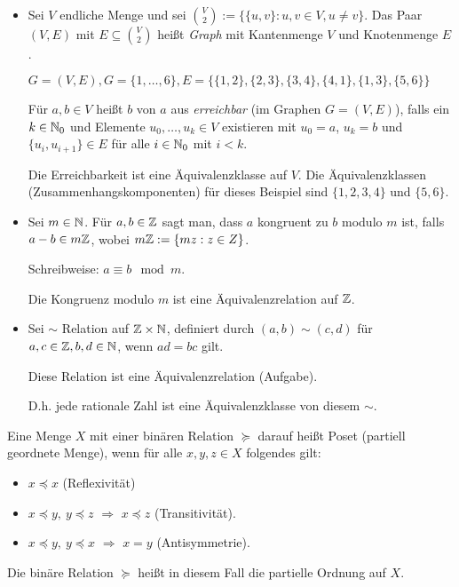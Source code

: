 \begin{bsp}\
\begin{itemize}
	\item Sei $ V $ endliche Menge und sei $ \binom{V}{2} := \{ \{ u,v \} : u,v \in V, u \neq v \} $. Das Paar $ (V,E) $ mit $ E \subseteq \binom{V}{2} $ heißt \emph{Graph} mit Kantenmenge $ V $ und Knotenmenge $ E $.
	
	$ G = (V,E), G = \{ 1,\ldots,6 \}, E = \{ \{ 1,2 \}, \{ 2,3 \}, \{ 3,4 \}, \{ 4,1 \}, \{ 1,3 \}, \{ 5,6 \} \} $
	
	Für $ a,b \in V $ heißt $ b $ von $ a $ aus \emph{erreichbar} (im Graphen $ G = (V,E) $), falls ein $ k \in \mathbb{N}_0 $ und Elemente $ u_0,\ldots,u_k \in V $ existieren mit $ u_0 = a $, $ u_k = b $ und $ \{ u_i,u_{i+1} \} \in E $ für alle $ i \in \mathbb{N}_0 $ mit $ i < k $.
	
	Die Erreichbarkeit ist eine Äquivalenzklasse auf $ V $.	Die Äquivalenzklassen (Zusammenhangskomponenten) für dieses Beispiel sind $ \{ 1,2,3,4 \} $ und $ \{ 5,6 \} $.
	
	\item Sei $ m \in \mathbb{N} $. Für $ a,b \in \mathbb{Z} $ sagt man, dass $ a $ kongruent zu $ b $ modulo $ m $ ist, falls $ a-b \in m\mathbb{Z} $, wobei $ m\mathbb{Z} := \{ mz : z \in Z \} $.
	
	Schreibweise: $ a \equiv b \mod{m} $.
	
	Die Kongruenz modulo $ m $ ist eine Äquivalenzrelation auf $ \mathbb{Z} $.
	
	\item Sei $ \sim $ Relation auf $ \mathbb{Z} \times \mathbb{N} $, definiert durch $ (a,b) \sim (c,d) $ für $ a,c \in \mathbb{Z}, b,d \in \mathbb{N} $, wenn $ ad = bc $ gilt.
	
	Diese Relation ist eine Äquivalenzrelation (Aufgabe).
	
	D.h. jede rationale Zahl ist eine Äquivalenzklasse von diesem $ \sim $.
\end{itemize}
\end{bsp}


\begin{defn}
	Eine Menge $X$ mit einer binären Relation $\succeq$ darauf heißt Poset (partiell geordnete Menge), wenn für alle $x,y,z \in X$ folgendes gilt: 
	\begin{itemize}
		\item $x \preceq x$ (Reflexivität)
		\item $x \preceq y, \ y \preceq z$ $\Rightarrow$ $x \preceq z$ (Transitivität). 
		\item $x \preceq y, \ y \preceq x$ $\Rightarrow$ $x = y$ (Antisymmetrie). 
	\end{itemize} 
	Die binäre Relation $\succeq$ heißt in diesem Fall die partielle Ordnung auf $X$. 
\end{defn} 


